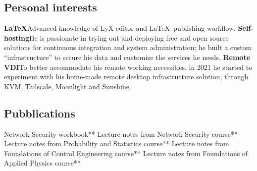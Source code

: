     \bigskip
    \subsection{Personal interests}
        {\textbf{LaTeX}}{Advanced knowledge of LyX editor and \LaTeX~publishing workflow.}
        {\textbf{Self-hosting}}{He is passionate in trying out and deploying free and open source solutions for continuous integration and system administration; he built a custom ``infrastructure'' to secure his data and customize the services he needs.}
        {\textbf{Remote VDI}}{To better accommodate his remote working necessities, in 2021 he started to experiment with his home-made remote desktop infrastructure solution, through KVM, Tailscale, Moonlight and Sunshine.}

    \bigskip
    \subsection{Pubblications}
        {Network Security workbook**}
        {Lecture notes from Network Security course**}
        {Lecture notes from Probability and Statistics course**}
        {Lecture notes from Foundations of Control Engineering course**}
        {Lecture notes from Foundations of Applied Physics course**}

